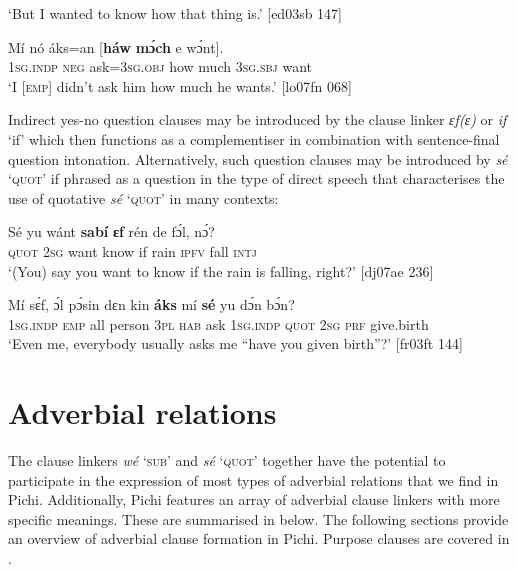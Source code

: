 \glt ‘But I wanted to know how that thing is.’ [ed03sb 147]
\z


\ea%
    \label{ex:key:1455}
    \gll Mí    nó  áks=an    [\textbf{háw}  \textbf{mɔ́ch}  e    wɔ́nt].\\
\textsc{1sg.indp}  \textsc{neg}  ask=\textsc{3sg.obj}   \phantom{[}how  much  \textsc{3sg.sbj}  want\\

\glt ‘I [\textsc{emp}] didn’t ask him how much he wants.’ [lo07fn 068]
\z

Indirect yes-no question clauses may be introduced by the clause linker \textit{ɛf(ɛ)} or \textit{if} ‘if’ which then functions as a complementiser in combination with sentence-final question intonation. Alternatively, such question clauses may be introduced by \textit{sé} ‘\textsc{quot}’ if phrased as a question in the type of direct speech that characterises the use of quotative \textit{sé} ‘\textsc{quot}’ in many contexts:


\ea%
    \label{ex:key:1456}
    \gll Sé    yu  wánt  \textbf{sabí}    \textbf{ɛf}  rén    de  fɔ́l,  nɔ́?\\
\textsc{quot}    \textsc{2sg}  want  know  if  rain    \textsc{ipfv}  fall  \textsc{intj}\\

\glt ‘(You) say you want to know if the rain is falling, right?’ [dj07ae 236]
\z


\ea%
    \label{ex:key:1457}
    \gll Mí    sɛ́f,  ɔ́l  pɔ́sin  dɛn  kin  \textbf{áks}  mí    \textbf{sé}
yu  dɔ́n  bɔ́n?\\
\textsc{1sg.indp}  \textsc{emp}  all  person  \textsc{3pl}  \textsc{hab}  ask  \textsc{1sg.indp}  \textsc{quot}
\textsc{2sg}  \textsc{prf}  give.birth\\

\glt ‘Even me, everybody usually asks me “have you given 
birth”?’ [fr03ft 144]
\z

\section{Adverbial relations}\label{sec:10.7}

The clause linkers \textit{wé} ‘\textsc{sub}’ and \textit{sé} \textsc{‘quot’} together have the potential to participate in the expression of most types of adverbial relations that we find in Pichi. Additionally, Pichi features an array of adverbial clause linkers with more specific meanings. These are summarised in  below. The following sections provide an overview of adverbial clause formation in Pichi. Purpose clauses are covered in .


